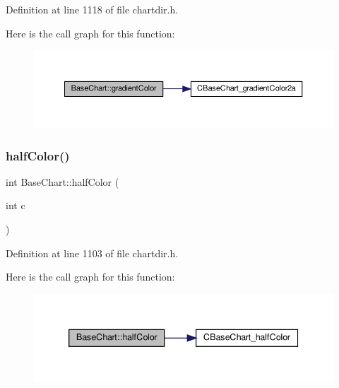 Definition at line 1118 of file chartdir.\+h.

Here is the call graph for this function\+:
\nopagebreak
\begin{figure}[H]
\begin{center}
\leavevmode
\includegraphics[width=350pt]{class_base_chart_afccfb0b504a015434d0e8504d683f0b5_cgraph}
\end{center}
\end{figure}
\mbox{\label{class_base_chart_a206a27f68bab2ada4a2f6fb4fe0e1195}} 
\subsubsection{\texorpdfstring{half\+Color()}{halfColor()}}
{\footnotesize\ttfamily int Base\+Chart\+::half\+Color (\begin{DoxyParamCaption}\item[{int}]{c }\end{DoxyParamCaption})\hspace{0.3cm}{\ttfamily [inline]}}



Definition at line 1103 of file chartdir.\+h.

Here is the call graph for this function\+:
\nopagebreak
\begin{figure}[H]
\begin{center}
\leavevmode
\includegraphics[width=339pt]{class_base_chart_a206a27f68bab2ada4a2f6fb4fe0e1195_cgraph}
\end{center}
\end{figure}
\mbox{\label{class_base_chart_a583eeb7a216ad16fb331f419649fb0e8}} 
